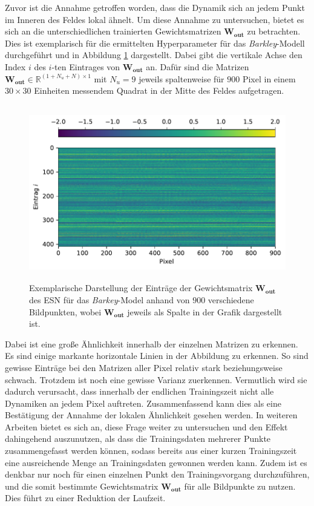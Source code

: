 Zuvor ist die Annahme getroffen worden, dass die Dynamik sich an jedem Punkt im Inneren des Feldes lokal ähnelt. Um diese Annahme zu untersuchen, bietet es sich an die unterschiedlichen trainierten Gewichtsmatrizen $\mathbf{W_{out}}$ zu betrachten. Dies ist exemplarisch für die ermittelten Hyperparameter für das \textit{Barkley}-Modell durchgeführt und in Abbildung \ref{fig:exp_cross_esn_weights} dargestellt. Dabei gibt die vertikale Achse den Index $i$ des $i$-ten Eintrages von $\mathbf{W_{out}}$ an. Dafür sind die Matrizen $\mathbf{W_{out}} \in \mathbb{R}^{(1 + N_u + N) \times 1}$ mit $N_u = 9$ jeweils spaltenweise für $900$ Pixel in einem $30 \times 30$ Einheiten messendem Quadrat in der Mitte des Feldes aufgetragen.

\begin{figure}[H]
	\centering
	\includegraphics[height=3.0in]{figures/results/cross_prediction/weights.pdf}
	\setcapmargin[1cm]{1cm}
	\caption{Exemplarische Darstellung der Einträge der Gewichtsmatrix $\mathbf{W_{out}}$ des \textsc{ESN} für das \textit{Barkey}-Model anhand von $900$ verschiedene Bildpunkten, wobei $\mathbf{W_{out}}$ jeweils als Spalte in der Grafik dargestellt ist.}
	\label{fig:exp_cross_esn_weights}
\end{figure}

Dabei ist eine große Ähnlichkeit innerhalb der einzelnen Matrizen zu erkennen. Es sind einige markante horizontale Linien in der Abbildung zu erkennen. So sind gewisse Einträge bei den Matrizen aller Pixel relativ stark beziehungsweise schwach. Trotzdem ist noch eine gewisse Varianz zuerkennen. Vermutlich wird sie dadurch verursacht, dass innerhalb der endlichen Trainingszeit nicht alle Dynamiken an jedem Pixel auftreten. Zusammenfassend kann dies als eine Bestätigung der Annahme der lokalen Ähnlichkeit gesehen werden. In weiteren Arbeiten bietet es sich an, diese Frage weiter zu untersuchen und den Effekt dahingehend auszunutzen, als dass die Trainingsdaten mehrerer Punkte zusammengefasst werden können, sodass bereits aus einer kurzen Trainingszeit eine ausreichende Menge an Trainingsdaten gewonnen werden kann. Zudem ist es denkbar nur noch für einen einzelnen Punkt den Trainingsvorgang durchzuführen, und die somit bestimmte Gewichtsmatrix $\mathbf{W_{out}}$ für alle Bildpunkte zu nutzen. Dies führt zu einer Reduktion der Laufzeit.


